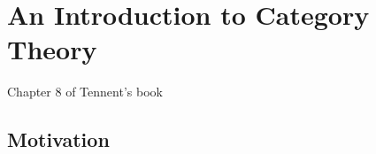 \chapter{An Introduction to Category Theory}

Chapter 8 of Tennent's book

\section{Motivation}
\todo
